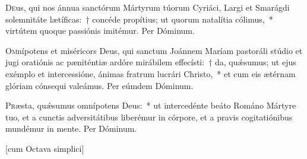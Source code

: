 \documentclass[vesperale_romanum.tex]{subfiles}
\begin{document}
\oratio

\lettrine{D}{e}us, qui nos ánnua sanctórum Mártyrum túorum Cyriáci, Largi et Smarágdi solemnitáte lætíficas:~† concéde propítius; ut quorum natalítia cólimus,~*  virtútem quoque passiónis
imitémur. Per Dóminum.


\myrule

\duplexmtv

\oratio

\lettrine{O}{m}nípotens et miséricors Deus, qui sanctum Joánnem Maríam pastoráli stúdio et jugi oratiónis ac pæniténtiæ ardóre mirábilem effecísti:~† da, quǽsumus; ut ejus exémplo et intercessióne, ánimas fratrum lucrári Christo,~* et cum eis ætérnam glóriam cónsequi valeámus. Per eúmdem Dóminum.



\oratio

\lettrine{P}{r}æsta, quǽsumus omnípotens Deus:~* ut intercedénte beáto Románo Mártyre tuo, et a cunctis adversitátibus liberémur in córpore, et a pravis cogitatiónibus mundémur in mente.
Per Dóminum.

\vespsequentiscomm

\myrule

\newpage


[cum Octava simplici]






\end{document}
